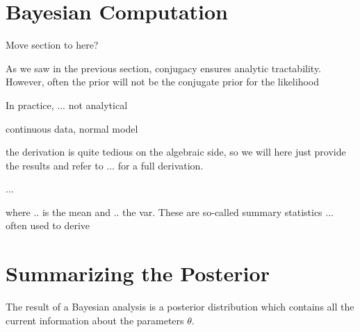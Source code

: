 




\section{Bayesian Computation}

Move section to here?

As we saw in the previous section, conjugacy ensures analytic tractability. However, often the prior will not be the conjugate prior for the likelihood

In practice, ... not analytical

continuous data, normal model 

the derivation is quite tedious on the algebraic side, so we will here just provide the results and refer to ... for a full derivation.

...

where .. is the mean and .. the var. These are so-called summary statistics ... often used to derive

\section{Summarizing the Posterior}

The result of a Bayesian analysis is a posterior distribution which contains all the current information about the parameters $\theta$. 


